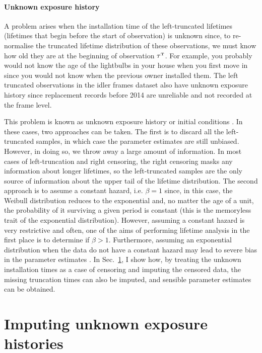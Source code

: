 \paragraph{Unknown exposure history}

A problem arises when the installation time of the left-truncated lifetimes (lifetimes that begin before the start of observation) is unknown since, to re-normalise the truncated lifetime distribution of these observations, we must know how old they are at the beginning of observation $\tau^{\hbox{\tiny{T}}}$. For example, you probably would not know the age of the lightbulbs in your house when you first move in since you would not know when the previous owner installed them. The left truncated observations in the idler frames dataset also have unknown exposure history since replacement records before 2014 are unreliable and not recorded at the frame level.

This problem is known as unknown exposure history or initial conditions \citep{guo1993}. In these cases, two approaches can be taken. The first is to discard all the left-truncated samples, in which case the parameter estimates are still unbiased. However, in doing so, we throw away a large amount of information. In most cases of left-truncation and right censoring, the right censoring masks any information about longer lifetimes, so the left-truncated samples are the only source of information about the upper tail of the lifetime distribution. The second approach is to assume a constant hazard, i.e. $\beta = 1$ since, in this case, the Weibull distribution reduces to the exponential and, no matter the age of a unit, the probability of it surviving a given period is constant (this is the memoryless trait of the exponential distribution). However, assuming a constant hazard is very restrictive and often, one of the aims of performing lifetime analysis in the first place is to determine if $\beta > 1$. Furthermore, assuming an exponential distribution when the data do not have a constant hazard may lead to severe bias in the parameter estimates \citep{heckman1986}. In Sec.~\ref{sec:lt-imputation}, I show how, by treating the unknown installation times as a case of censoring and imputing the censored data, the missing truncation times can also be imputed, and sensible parameter estimates can be obtained.

\section{Imputing unknown exposure histories} \label{sec:lt-imputation}

